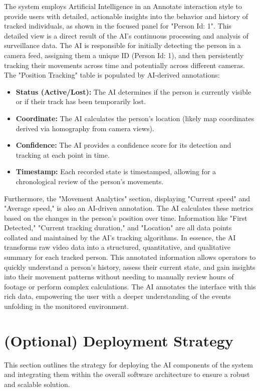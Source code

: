 The system employs Artificial Intelligence in an Annotate interaction style to provide users with detailed, actionable insights into the behavior and history of tracked individuals, as shown in the focused panel for "Person Id: 1". This detailed view is a direct result of the AI's continuous processing and analysis of surveillance data.
The AI is responsible for initially detecting the person in a camera feed, assigning them a unique ID (Person Id: 1), and then persistently tracking their movements across time and potentially across different cameras. The "Position Tracking" table is populated by AI-derived annotations:
\begin{itemize}
    \item   \textbf{Status (Active/Lost):} The AI determines if the person is currently visible or if their track has been temporarily lost.
    \item   \textbf{Coordinate:} The AI calculates the person's location (likely map coordinates derived via homography from camera views).
    \item   \textbf{Confidence:} The AI provides a confidence score for its detection and tracking at each point in time.
    \item   \textbf{Timestamp:} Each recorded state is timestamped, allowing for a chronological review of the person's movements. 
\end{itemize}
Furthermore, the "Movement Analytics" section, displaying "Current speed" and "Average speed," is also an AI-driven annotation. The AI calculates these metrics based on the changes in the person's position over time. Information like "First Detected," "Current tracking duration," and "Location" are all data points collated and maintained by the AI's tracking algorithms.
In essence, the AI transforms raw video data into a structured, quantitative, and qualitative summary for each tracked person. This annotated information allows operators to quickly understand a person's history, assess their current state, and gain insights into their movement patterns without needing to manually review hours of footage or perform complex calculations. The AI annotates the interface with this rich data, empowering the user with a deeper understanding of the events unfolding in the monitored environment.

\section{(Optional) Deployment Strategy}
\label{section:deployment} %
This section outlines the strategy for deploying the AI components of the \usevar{\srsTitle} system and integrating them within the overall software architecture to ensure a robust and scalable solution.


